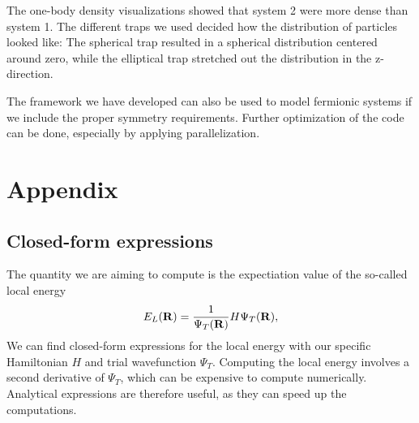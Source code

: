 \documentclass[english, a4paper]{article}
\begin{document}
The one-body density visualizations showed that system 2 were more dense than system 1. The different traps we used
decided how the distribution of particles looked like: The spherical trap resulted in a spherical distribution
centered around zero, while the elliptical trap stretched out the distribution in the z-direction. 

The framework we have developed can also be used to model fermionic systems if we include the proper
symmetry requirements. Further optimization of the code can be done, especially by applying parallelization. 




\section{Appendix}

\subsection{Closed-form expressions}

The quantity we are aiming to compute is the expectiation value of the so-called local energy
 \begin{equation}
    E_L({\bf R})=\frac{1}{\Psi_T({\bf R})}H\Psi_T({\bf R}),
    \label{localenergy2}
 \end{equation}
We can find closed-form expressions for the local energy with our specific Hamiltonian $H$ and trial wavefunction $\Psi_T$.
Computing the local energy involves a second derivative of $\Psi_T$, which can be expensive to compute numerically. 
Analytical expressions are therefore useful, as they can speed up the computations.\\
\end{document}

